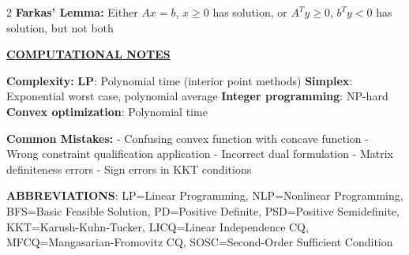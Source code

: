 \documentclass[8pt,a4paper,landscape]{article}
\newcommand{\mysection}[1]{\textbf{\underline{#1}}}
\newcommand{\mysubsection}[1]{\textbf{#1:}}
\begin{document}
\begin{multicols}{2}
\mysubsection{Farkas' Lemma}
Either $Ax = b$, $x \geq 0$ has solution, or $A^Ty \geq 0$, $b^Ty < 0$ has solution, but not both

\mysection{COMPUTATIONAL NOTES}

\mysubsection{Complexity}
\textbf{LP}: Polynomial time (interior point methods)
\textbf{Simplex}: Exponential worst case, polynomial average
\textbf{Integer programming}: NP-hard
\textbf{Convex optimization}: Polynomial time

\mysubsection{Common Mistakes}
- Confusing convex function with concave function
- Wrong constraint qualification application  
- Incorrect dual formulation
- Matrix definiteness errors
- Sign errors in KKT conditions

\end{multicols}

\vfill
\centerline{\textbf{ABBREVIATIONS}: LP=Linear Programming, NLP=Nonlinear Programming, BFS=Basic Feasible Solution, PD=Positive Definite, PSD=Positive Semidefinite, KKT=Karush-Kuhn-Tucker, LICQ=Linear Independence CQ, MFCQ=Mangasarian-Fromovitz CQ, SOSC=Second-Order Sufficient Condition}
\end{document}
